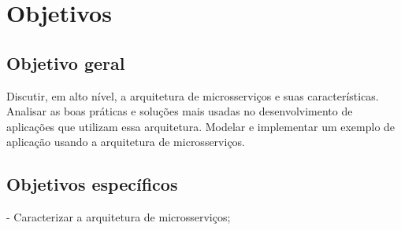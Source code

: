 

\section{Objetivos}\label{sec-objetivos}


\subsection{Objetivo geral}\label{sec-objetivo-geral}

Discutir, em alto nível, a arquitetura de microsserviços e suas características. Analisar as boas práticas e soluções mais usadas no desenvolvimento de aplicações que utilizam essa arquitetura. Modelar e implementar um exemplo de aplicação usando a arquitetura de microsserviços.

\subsection{Objetivos específicos}\label{sec-objetivos-especificos}

- Caracterizar a arquitetura de microsserviços;

